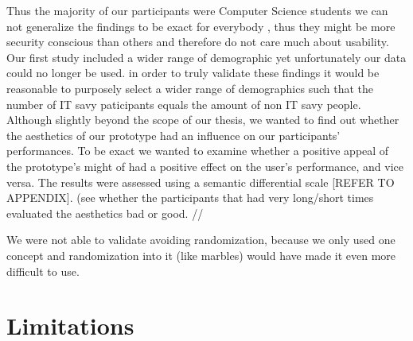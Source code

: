 Thus the majority of our participants were Computer Science students we can not generalize the findings to be exact for everybody , thus they might be more security conscious than others and therefore do not care much about usability. Our first study included a wider range of demographic yet unfortunately our data could no longer be used. in order to truly validate these findings it would be reasonable to purposely select a wider range of demographics such that the number of IT savy paticipants equals the amount of non IT savy people.  \\


Although slightly beyond the scope of our thesis, we wanted to find out whether the aesthetics of our prototype had an influence on our participants' performances. To be exact we wanted to examine whether a positive appeal of the prototype's might of had a positive effect on the user's performance, and vice versa. The results were assessed using a semantic differential scale [REFER TO APPENDIX]. (see whether the participants that had very long/short times evaluated the aesthetics bad or good.  //


We were not able to validate avoiding randomization, because we only used one concept and randomization into it (like marbles) would have made it even more difficult to use. 

\section{Limitations}
